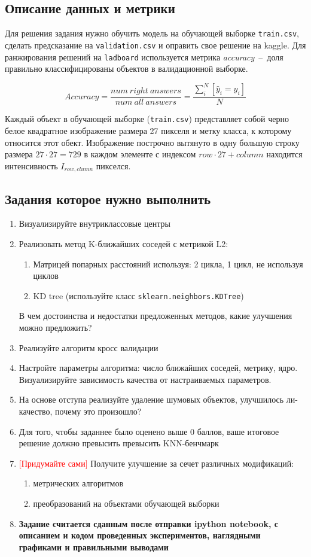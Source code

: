 \documentclass[a4paper, 12pt]{article}
\begin{document}
\subsection*{Описание данных и метрики}
Для решения задания нужно обучить модель на обучающей выборке \texttt{train.csv}, сделать предсказание на \texttt{validation.csv} и оправить свое решение на kaggle. Для ранжирования решений на \texttt{ladboard} используется метрика \emph{accuracy}~--~доля правильно классифицированы объектов в валидационной выборке. 

$$Accuracy = \frac{num~right~answers}{num~all~answers} = \frac{\sum_i^N [\hat{y}_i = y_i]}{N}$$

Каждый объект в обучающей выборке (\texttt{train.csv}) представляет собой черно белое квадратное изображение размера 27 пикселя и метку класса, к которому относится этот обект. Изображение построчно вытянуто в одну большую строку размера $27\cdot27 = 729$ в каждом элементе с индексом $row\cdot27 + column$ находится интенсивность $I_{row, clumn}$ пикселся. 

\subsection*{Задания которое нужно выполнить}
\begin{enumerate}
	\item Визуализируйте внутриклассовые центры 
	\item Реализовать метод K-ближайших соседей с метрикой L2:
      \begin{enumerate}
          \item Матрицей попарных расстояний используя: 2 цикла, 1 цикл, не используя циклов
          \item KD tree (используйте класс \texttt{sklearn.neighbors.KDTree})
      \end{enumerate}
	В чем достоинства и недостатки предложенных методов, какие улучшения можно предложить? 
    
    \item Реализуйте алгоритм кросс валидации
    \item Настройте параметры алгоритма: число ближайших соседей, метрику, ядро. Визуализируйте  зависимость качества от настраиваемых параметров.
    \item На основе отступа реализуйте удаление шумовых объектов, улучшилось ли-качество, почему это произошло?
    \item Для того, чтобы заданнее было оценено выше 0 баллов, ваше итоговое решение должно превысить превысить KNN-бенчмарк 
    \item \textcolor{red}{[Придумайте сами]} Получите улучшение за сечет различных модификаций: 
    	\begin{enumerate}
			\item метрических алгоритмов
            \item преобразований на объектами обучающей выборки
		\end{enumerate}
    \item \textbf{Задание считается сданным после отправки ipython notebook, с описанием и кодом проведенных экспериментов, наглядными графиками и правильными выводами} 
\end{enumerate}
\end{document}
